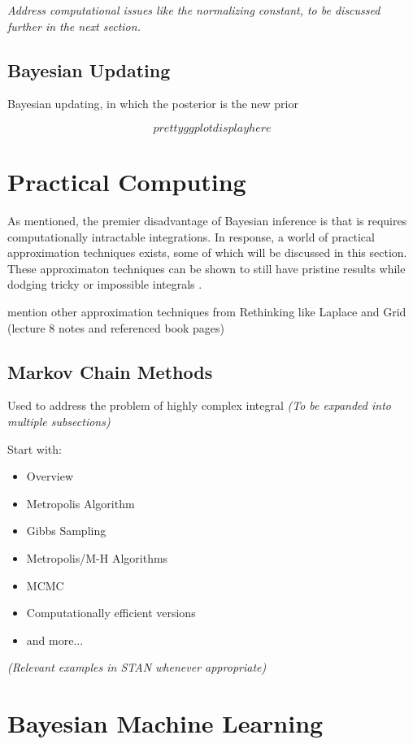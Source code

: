 \textit{Address computational issues like the normalizing constant, to be discussed further in the next section.}


\subsection{Bayesian Updating}

Bayesian updating, in which the posterior is the new prior

$$
pretty ggplot display here
$$

\section{Practical Computing}

 As mentioned, the premier disadvantage of Bayesian inference is that is requires computationally intractable integrations.  In response, a world of practical approximation techniques exists, some of which will be discussed in this section.  These approximaton techniques can be shown to still have pristine results while dodging tricky or impossible integrals \cite{tipping2004bayesian}.

 mention other approximation techniques from Rethinking like Laplace and Grid (lecture 8 notes and referenced book pages)


\subsection{Markov Chain Methods}
Used to address the problem of highly complex integral
\textit{(To be expanded into multiple subsections)}

Start with:
\cite{mcelreath2016statistical} \cite{gelmanbayesian3}
\begin{itemize}
\tightlist
\item Overview
\item Metropolis Algorithm
\item Gibbs Sampling \cite{geman1984stochastic}
\item Metropolis/M-H Algorithms
\item MCMC
\item Computationally efficient versions
\item and more...
\end{itemize}

\textit{(Relevant examples in STAN whenever appropriate)}


\section{Bayesian Machine Learning} %

